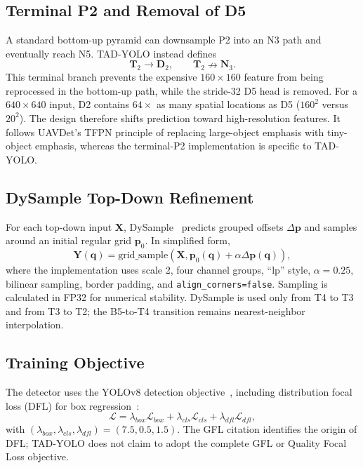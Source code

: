 \documentclass[conference]{IEEEtran}
\begin{document}
\subsection{Terminal P2 and Removal of D5}
A standard bottom-up pyramid can downsample P2 into an N3 path and eventually
reach N5.  TAD-YOLO instead defines
\begin{equation}
\mathbf{T}_2\rightarrow\mathbf{D}_2,
\qquad
\mathbf{T}_2\nrightarrow\mathbf{N}_3.
\end{equation}
This terminal branch prevents the expensive $160\times160$ feature from being
reprocessed in the bottom-up path, while the stride-32 D5 head is removed.
For a $640\times640$ input, D2 contains $64\times$ as many spatial locations
as D5 ($160^2$ versus $20^2$).  The design therefore shifts prediction toward
high-resolution features.  It follows UAVDet's TFPN principle of replacing
large-object emphasis with tiny-object emphasis, whereas the terminal-P2
implementation is specific to TAD-YOLO.

\subsection{DySample Top-Down Refinement}
For each top-down input $\mathbf{X}$, DySample~\cite{liu2023dysample}
predicts grouped offsets
$\Delta\mathbf{p}$ and samples around an initial regular grid
$\mathbf{p}_0$.  In simplified form,
\begin{equation}
\mathbf{Y}(\mathbf{q})=
\mathrm{grid\_sample}\!\left(
\mathbf{X},\mathbf{p}_0(\mathbf{q})+\alpha\Delta\mathbf{p}(\mathbf{q})
\right),
\end{equation}
where the implementation uses scale 2, four channel groups, ``lp'' style,
$\alpha=0.25$, bilinear sampling, border padding, and
\texttt{align\_corners=false}.  Sampling is calculated in FP32 for numerical
stability.  DySample is used only from T4 to T3 and from T3 to T2; the
B5-to-T4 transition remains nearest-neighbor interpolation.

\subsection{Training Objective}
The detector uses the YOLOv8 detection objective~\cite{jocher2023yolov8},
including distribution focal loss (DFL) for box
regression~\cite{li2020gfl}:
\begin{equation}
\mathcal{L}=\lambda_{box}\mathcal{L}_{box}
+\lambda_{cls}\mathcal{L}_{cls}
+\lambda_{dfl}\mathcal{L}_{dfl},
\end{equation}
with $(\lambda_{box},\lambda_{cls},\lambda_{dfl})=(7.5,0.5,1.5)$.
The GFL citation identifies the origin of DFL; TAD-YOLO does not claim to
adopt the complete GFL or Quality Focal Loss objective.
\end{document}
